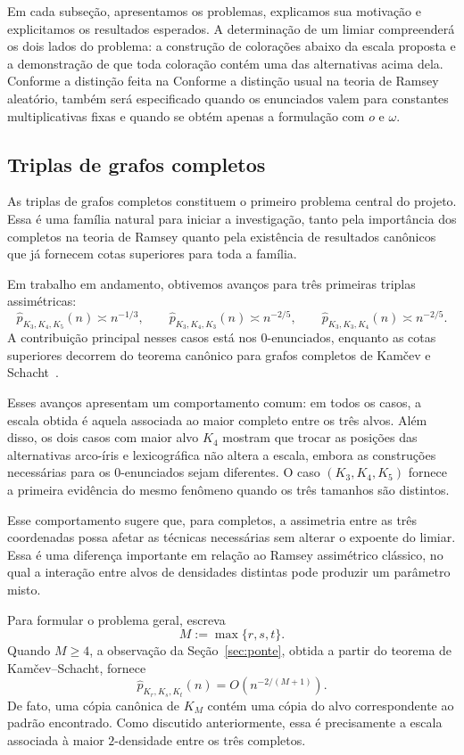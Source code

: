 \documentclass[11pt,a4paper]{article}
\theoremstyle{plain}
\theoremstyle{definition}
\begin{document}
Em cada subseção, apresentamos os problemas, explicamos sua motivação e
explicitamos os resultados esperados. A determinação de um limiar
compreenderá os dois lados do problema: a construção de colorações
abaixo da escala proposta e a demonstração de que toda coloração contém
uma das alternativas acima dela. Conforme a distinção feita na
Conforme a distinção usual na teoria de Ramsey aleatório, também será especificado quando os
enunciados valem para constantes multiplicativas fixas e quando se
obtém apenas a formulação com $o$ e $\omega$.


\subsection{Triplas de grafos completos}
\label{sec:cliques}


As triplas de grafos completos constituem o primeiro problema central
do projeto. Essa é uma família natural para iniciar a investigação,
tanto pela importância dos completos na teoria de Ramsey quanto pela
existência de resultados canônicos que já fornecem cotas superiores
para toda a família.

Em trabalho em andamento, obtivemos avanços para três primeiras
triplas assimétricas:
\[
  \widehat p_{K_3,K_4,K_5}(n)\asymp n^{-1/3},
  \qquad
  \widehat p_{K_3,K_4,K_3}(n)\asymp n^{-2/5},
  \qquad
  \widehat p_{K_3,K_3,K_4}(n)\asymp n^{-2/5}.
\]
A contribuição principal nesses casos está nos $0$-enunciados,
enquanto as cotas superiores decorrem do teorema canônico para
grafos completos de Kamčev e Schacht~\cite{KS}.

Esses avanços apresentam um comportamento comum: em todos os casos,
a escala obtida é aquela associada ao maior completo entre os três
alvos. Além disso, os dois casos com maior alvo $K_4$ mostram que
trocar as posições das alternativas arco-íris e lexicográfica não
altera a escala, embora as construções necessárias para os
$0$-enunciados sejam diferentes. O caso $(K_3,K_4,K_5)$ fornece
a primeira evidência do mesmo fenômeno quando os três tamanhos são
distintos.

Esse comportamento sugere que, para completos, a assimetria entre
as três coordenadas possa afetar as técnicas necessárias sem alterar
o expoente do limiar. Essa é uma diferença importante em relação ao
Ramsey assimétrico clássico, no qual a interação entre alvos de
densidades distintas pode produzir um parâmetro misto.

Para formular o problema geral, escreva
\[
  M:=\max\{r,s,t\}.
\]
Quando $M\ge4$, a observação da Seção~\ref{sec:ponte}, obtida a partir do
teorema de Kamčev--Schacht, fornece
\[
  \widehat p_{K_r,K_s,K_t}(n)
  =
  O\!\left(n^{-2/(M+1)}\right).
\]
De fato, uma cópia canônica de $K_M$ contém uma cópia do alvo
correspondente ao padrão encontrado. Como discutido anteriormente,
essa é precisamente a escala associada à maior $2$-densidade entre
os três completos.
\end{document}
